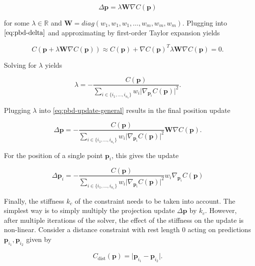 \begin{equation}\label{eq:pbd-update-general}
    \Delta \bm{p} = \lambda \bm{W} \nabla C(\bm{p})
\end{equation}

\noindent for some $\lambda \in \mathbb{R}$ and $\bm{W} = diag(w_1, w_1, w_1, \ldots, w_m, w_m, w_m)$. 
Plugging into $\cref{eq:pbd-delta}$ and approximating by first-order Taylor expansion yields

\[
    C(\bm{p} + \lambda \bm{W} \nabla C(\bm{p})) \approx C(\bm{p}) + \nabla C(\bm{p})^T \lambda \bm{W}
    \nabla C(\bm{p}) = 0.
\]

\noindent Solving for $\lambda$ yields

\begin{equation}\label{eq:pbd-lambda}
    \lambda = -\frac{C(\bm{p})}{\sum_{i \in \{ i_1, \ldots, i_{n_c} \}} w_i \vert \nabla_{\bm{p}_i}C(\bm{p}) \vert^2 }.
\end{equation}

\noindent Plugging $\lambda$ into \cref{eq:pbd-update-general} results in the final position update

\begin{equation}\label{eq:pbd-update}
    \Delta \bm{p} = -\frac{C(\bm{p})}{\sum_{i \in \{ i_1, \ldots, i_{n_c} \}} w_i \vert \nabla_{\bm{p}_i}C(\bm{p}) \vert^2 } 
    \bm{W}\nabla C(\bm{p}).
\end{equation}

\noindent For the position of a single point $\bm{p}_i$, this gives the update

\begin{equation}\label{eq:pbd-update-individual}
    \Delta \bm{p}_i = -\frac{C(\bm{p})}{\sum_{i \in \{ i_1, \ldots, i_{n_c} \}} w_i \vert \nabla_{\bm{p}_i}C(\bm{p}) \vert^2 } 
    w_i \nabla_{\bm{p}_i} C(\bm{p})
\end{equation}

Finally, the stiffness $k_c$ of the constraint needs to be taken into account. The simplest way is to simply multiply the projection update
$\Delta \bm{p}$ by $k_c$. However, after multiple iterations of the solver, the effect of the stiffness on the update is non-linear. Consider
a distance constraint with rest length 0 acting on predictions $\bm{p}_{i_1}, \bm{p}_{i_2}$ given by

\begin{equation}\label{eq:pbd-distance}
    C_{\text{dist}}(\bm{p}) = \vert \bm{p}_{i_1} - \bm{p}_{i_2} \vert.
\end{equation}

